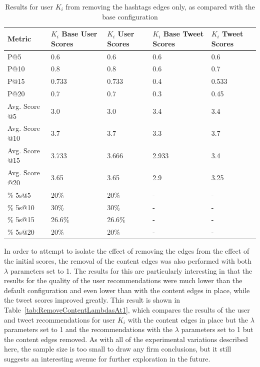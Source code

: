 \begin{table}
\centering
\begin{tabular}{l|p{2.2cm}|p{2.2cm}|p{2.2cm}|p{2.2cm}}
{\bf Metric} & {\bf $K_{i}$ Base User Scores} & {\bf $K_{i}$ User Scores} & {\bf $K_{i}$ Base Tweet Scores} & {\bf $K_{i}$ Tweet Scores} \\ \hline
P@5   & 0.6 & 0.6 & 0.6 & 0.6 \\ \hline
P@10 & 0.8 & 0.8 & 0.6 & 0.7 \\ \hline
P@15 & 0.733 & 0.733 & 0.4 & 0.533 \\ \hline
P@20 & 0.7 & 0.7 & 0.3 & 0.45 \\ \hline

Avg. Score @5   & 3.0 & 3.0 & 3.4 & 3.4 \\ \hline
Avg. Score @10 & 3.7 & 3.7 & 3.3 & 3.7 \\ \hline
Avg. Score @15 & 3.733 & 3.666 & 2.933 & 3.4 \\ \hline
Avg. Score @20 & 3.65 & 3.65 & 2.9 & 3.25 \\ \hline

\% 5s@5    & 20\% & 20\% & - & - \\ \hline
\% 5s@10  & 30\% & 30\% & - & - \\ \hline
\% 5s@15  & 26.6\% & 26.6\% & - & - \\ \hline
\% 5s@20  & 20\% & 20\% & - & - \\

\end{tabular}
\caption{Results for user $K_{i}$ from removing the hashtags edges only, as compared with the base configuration}
\label{tab:RemoveHashtags}
\end{table}


In order to attempt to isolate the effect of removing the edges from the effect of the initial scores, the removal of the content edges was also performed with both $\lambda$ parameters set to 1. The results for this are particularly interesting in that the results for the quality of the user recommendations were much lower than the default configuration and even lower than with the content edges in place, while the tweet scores improved greatly. This result is shown in Table~\ref{tab:RemoveContentLambdasAt1}, which compares the results of the user and tweet recommendations for user $K_{i}$ with the content edges in place but the $\lambda$ parameters set to 1 and the recommendations with the $\lambda$ parameters set to 1 but the content edges removed. As with all of the experimental variations described here, the sample size is too small to draw any firm conclusions, but it still suggests an interesting avenue for further exploration in the future.


